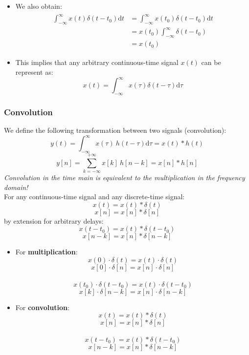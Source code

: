  \begin{itemize}
\item We also obtain:
\begin{align*}\begin{split}
\int_{-\infty}^{\infty} x(t)\delta(t-t_{0})\mathrm{d}t &= \int_{-\infty}^{\infty} x(t_{0})\delta(t-t_{0})\mathrm{d}t \\
&= x(t_{0})\int_{-\infty}^{\infty} \delta(t-t_{0})\\
&= x(t_{0}) 
\end{split}
\end{align*}
\item This implies that any arbitrary continuous-time signal $x(t)$ can be represent as:
\[ x(t) = \int_{-\infty}^{\infty} x(\tau)\delta(t-\tau)\mathrm{d}\tau \]
\end{itemize}

\subsubsection{Convolution}
We define the following transformation between two signals (convolution):
\[ y(t) = \int_{-\infty}^{\infty} x(\tau) \ h(t-\tau)\mathrm{d}\tau = x(t)*h(t) \]
\[ y[n] = \sum_{k=-\infty}^{+\infty}x[k] \ h[n-k] = x[n]*h[n] \]
\textit{Convolution in the time main is equivalent to the multiplication in the frequency domain!} \\

For any continuous-time signal and any discrete-time signal:
\[ x(t) = x(t) * \delta(t) \]
\[ x[n] = x[n] * \delta[n] \]
by extension for arbitrary delays:
\[ x(t-t_{0}) = x(t) * \delta(t-t_{0}) \]
\[ x[n-k] = x[n] * \delta[n-k] \]

\begin{tcolorbox}[title=Summary of properties of the unit impulse, breakable]
 \begin{itemize}
  \item For \textbf{multiplication}:
   \[ x(0)\cdot \delta(t) = x(t)\cdot \delta(t) \]
   \[ x[0]\cdot \delta[n] = x[n]\cdot \delta[n] \]
\ \\ 
   \[ x(t_{0})\cdot \delta(t-t_{0}) = x(t)\cdot \delta(t-t_{0}) \]
   \[ x[k]\cdot \delta[n-k] = x[n] \cdot \delta[n-k] \]
  \item For \textbf{convolution}:
   \[ x(t) = x(t)*\delta(t) \]
   \[ x[n] = x[n]*\delta[n] \]
\ \\
   \[  x(t-t_{0}) = x(t)* \delta(t-t_{0}) \]
   \[ x[n-k] = x[n]*\delta[n-k] \]
 \end{itemize}
\end{tcolorbox} 

